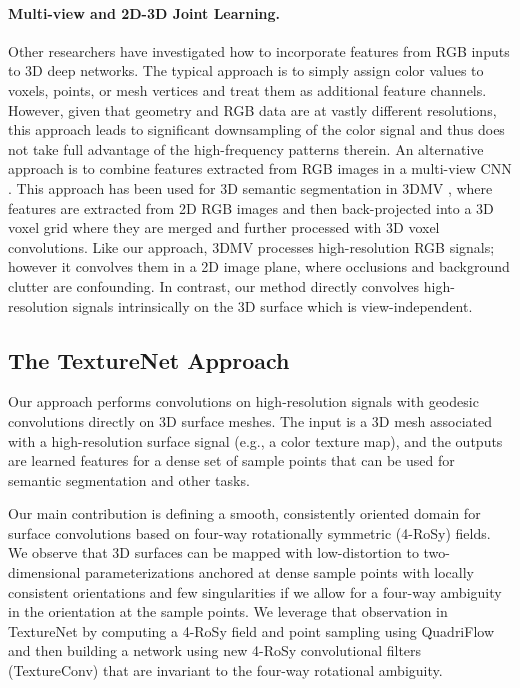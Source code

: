 \paragraph*{Multi-view and 2D-3D Joint Learning.}
Other researchers have investigated how to incorporate features from RGB inputs to 3D deep networks.  The typical approach is to simply assign color values to voxels, points, or mesh vertices and treat them as additional feature channels.
However, given that geometry and RGB data are at vastly different resolutions, this approach leads to significant downsampling of the color signal and thus does not take full advantage of the high-frequency patterns therein.   An alternative approach is to combine features extracted from RGB images in a multi-view CNN \cite{su2015multi}. This approach has been used for 3D semantic segmentation in 3DMV \cite{dai20183dmv}, where features are extracted from 2D RGB images and then back-projected into a 3D voxel grid where they are merged and further processed with 3D voxel convolutions.  Like our approach, 3DMV processes high-resolution RGB signals; however it convolves them in a 2D image plane, where occlusions and background clutter are confounding.  In contrast, our method directly convolves high-resolution signals intrinsically on the 3D surface which is view-independent.


\subsection{The TextureNet Approach}
Our approach performs convolutions on high-resolution signals with geodesic convolutions directly on 3D surface meshes.
The input is a 3D mesh associated with a high-resolution surface signal (e.g., a color texture map), and the outputs are learned features for a dense set of sample points that can be used for semantic segmentation and other tasks.   

Our main contribution is defining a smooth, consistently oriented domain for surface convolutions based on four-way rotationally symmetric (4-RoSy) fields.   We observe that 3D surfaces can be mapped with low-distortion to two-dimensional parameterizations anchored at dense sample points with locally consistent orientations and few singularities if we allow for a four-way ambiguity in the orientation at the sample points.   We leverage that observation in TextureNet by computing a 4-RoSy field and point sampling using QuadriFlow~\cite{huang2018quadriflow} and then building a network using new 4-RoSy convolutional filters (TextureConv) that are invariant to the four-way rotational ambiguity.   


